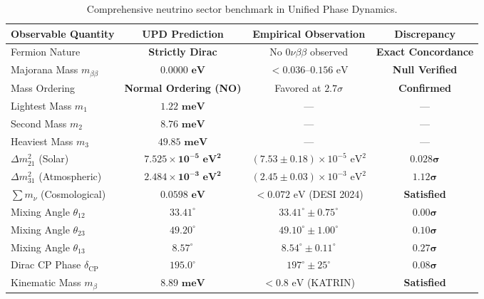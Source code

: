 \documentclass[11pt,a4paper]{article}
\theoremstyle{definition}
\begin{document}
\begin{table}[htbp]
\centering
\small
\setlength{\tabcolsep}{3pt}
\caption{Comprehensive neutrino sector benchmark in Unified Phase Dynamics.}
\label{tab:neutrino_benchmark}
\begin{tabular}{lccc}
\toprule
\textbf{Observable Quantity} & \textbf{UPD Prediction} & \textbf{Empirical Observation} & \textbf{Discrepancy} \\
\midrule
Fermion Nature & \textbf{Strictly Dirac} & No $0\nu\beta\beta$ observed & \textbf{Exact Concordance} \\
Majorana Mass $m_{\beta\beta}$ & $\mathbf{0.0000\text{ eV}}$ & $< 0.036\text{--}0.156\text{ eV}$ & \textbf{Null Verified} \\
Mass Ordering & \textbf{Normal Ordering (NO)} & Favored at $2.7\sigma$ & \textbf{Confirmed} \\
Lightest Mass $m_1$ & $\mathbf{1.22\text{ meV}}$ & --- & --- \\
Second Mass $m_2$ & $\mathbf{8.76\text{ meV}}$ & --- & --- \\
Heaviest Mass $m_3$ & $\mathbf{49.85\text{ meV}}$ & --- & --- \\
$\Delta m_{21}^2$ (Solar) & $\mathbf{7.525 \times 10^{-5}\text{ eV}^2}$ & $(7.53 \pm 0.18) \times 10^{-5}\text{ eV}^2$ & $\mathbf{0.028\sigma}$ \\
$\Delta m_{31}^2$ (Atmospheric) & $\mathbf{2.484 \times 10^{-3}\text{ eV}^2}$ & $(2.45 \pm 0.03) \times 10^{-3}\text{ eV}^2$ & $\mathbf{1.12\sigma}$ \\
$\sum m_\nu$ (Cosmological) & $\mathbf{0.0598\text{ eV}}$ & $< 0.072\text{ eV}$ (DESI 2024) & \textbf{Satisfied} \\
Mixing Angle $\theta_{12}$ & $\mathbf{33.41^\circ}$ & $33.41^\circ \pm 0.75^\circ$ & $\mathbf{0.00\sigma}$ \\
Mixing Angle $\theta_{23}$ & $\mathbf{49.20^\circ}$ & $49.10^\circ \pm 1.00^\circ$ & $\mathbf{0.10\sigma}$ \\
Mixing Angle $\theta_{13}$ & $\mathbf{8.57^\circ}$ & $8.54^\circ \pm 0.11^\circ$ & $\mathbf{0.27\sigma}$ \\
Dirac CP Phase $\delta_{\mathrm{CP}}$ & $\mathbf{195.0^\circ}$ & $197^\circ \pm 25^\circ$ & $\mathbf{0.08\sigma}$ \\
Kinematic Mass $m_\beta$ & $\mathbf{8.89\text{ meV}}$ & $< 0.8\text{ eV}$ (KATRIN) & \textbf{Satisfied} \\
\bottomrule
\end{tabular}
\end{table}
\end{document}
